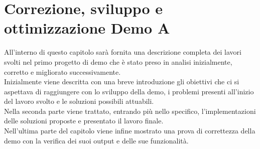 


\chapter{Correzione, sviluppo e ottimizzazione Demo A} \label{ch:DemoA}

All'interno di questo capitolo sarà fornita una descrizione completa dei lavori svolti nel primo progetto di demo che è stato preso in analisi inizialmente, corretto e migliorato successivamente.
\\ Inizialmente viene descritta con una breve introduzione gli obiettivi che ci si aspettava di raggiungere con lo sviluppo della demo, i problemi presenti all'inizio del lavoro svolto e le soluzioni possibili attuabili.
\\ Nella seconda parte viene trattato, entrando più nello specifico, l'implementazioni delle soluzioni proposte e presentato il lavoro finale. 
\\ Nell'ultima parte del capitolo viene infine mostrato una prova di correttezza della demo con la verifica dei suoi output e delle sue funzionalità.


